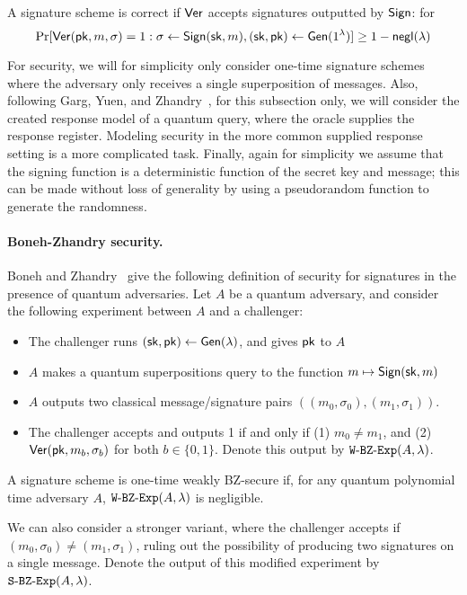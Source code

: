 A signature scheme is correct if ${\sf Ver}$ accepts signatures outputted by ${\sf Sign}$: for \[\Pr[{\sf Ver}({\sf pk},m,\sigma)=1:\sigma\gets{\sf Sign}({\sf sk},m),({\sf sk},{\sf pk})\gets{\sf Gen}(1^\lambda)]\geq 1-{\sf negl}(\lambda)\]

For security, we will for simplicity only consider one-time signature schemes where the adversary only receives a single superposition of messages.  Also, following Garg, Yuen, and Zhandry~\cite{C:GarYueZha17}, for this subsection only, we will consider the created response model of a quantum query, where the oracle supplies the response register.  Modeling security in the more common supplied response setting is a more complicated task.  Finally, again for simplicity we assume that the signing function is a deterministic function of the secret key and message; this can be made without loss of generality by using a pseudorandom function to generate the randomness.

\paragraph{Boneh-Zhandry security.}  Boneh and Zhandry~\cite{C:BonZha13} give the following definition of security for signatures in the presence of quantum adversaries.  Let $A$ be a quantum adversary, and consider the following experiment between $A$ and a challenger:
\begin{itemize}
	\item The challenger runs $({\sf sk},{\sf pk})\gets{\sf Gen}(\lambda)$, and gives ${\sf pk}$ to $A$
	\item $A$ makes a quantum superpositions query to the function $m\mapsto {\sf Sign}({\sf sk},m)$
	\item $A$ outputs two classical message/signature pairs $((m_0,\sigma_0),(m_1,\sigma_1))$.  
	\item The challenger accepts and outputs 1 if and only if (1) $m_0\neq m_1$, and (2) ${\sf Ver}({\sf pk},m_b,\sigma_b)$ for both $b\in\{0,1\}$.  Denote this output by ${\tt{W\text{-}BZ\text{-}Exp}}(A,\lambda)$.  
\end{itemize}

\begin{definition} A signature scheme is one-time weakly BZ-secure if, for any quantum polynomial time adversary $A$, ${\tt{W\text{-}BZ\text{-}Exp}}(A,\lambda)$ is negligible.
\end{definition}

We can also consider a stronger variant, where the challenger accepts if $(m_0,\sigma_0)\neq(m_1,\sigma_1)$, ruling out the possibility of producing two signatures on a single message.  Denote the output of this modified experiment by ${\tt{S\text{-}BZ\text{-}Exp}}(A,\lambda)$.

